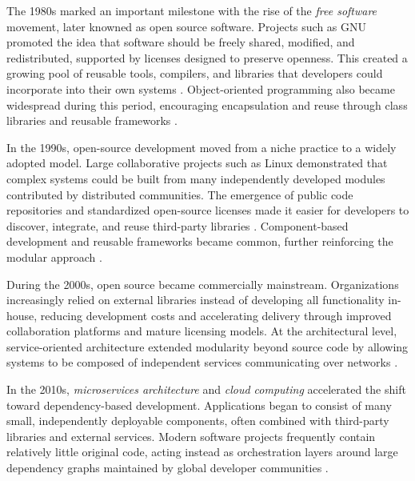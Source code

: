 \documentclass[12pt,a4paper]{report}
\begin{document}
The 1980s marked an important milestone with the rise of the \emph{free software} movement, later knowned as open source software. Projects such as GNU promoted the idea that software should be freely shared, modified, and redistributed, supported by licenses designed to preserve openness. This created a growing pool of reusable tools, compilers, and libraries that developers could incorporate into their own systems \parencite{ojhaEmergenceOrganizationalField2014}. Object-oriented programming also became widespread during this period, encouraging encapsulation and reuse through class libraries and reusable frameworks \parencite{aguilaSoftwareEngineeringTimeline2020}.

In the 1990s, open-source development moved from a niche practice to a widely adopted model. Large collaborative projects such as Linux demonstrated that complex systems could be built from many independently developed modules contributed by distributed communities. The emergence of public code repositories and standardized open-source licenses made it easier for developers to discover, integrate, and reuse third-party libraries \parencite{ojhaEmergenceOrganizationalField2014}. Component-based development and reusable frameworks became common, further reinforcing the modular approach \parencite{aguilaSoftwareEngineeringTimeline2020}.

During the 2000s, open source became commercially mainstream. Organizations increasingly relied on external libraries instead of developing all functionality in-house, reducing development costs and accelerating delivery through improved collaboration platforms and mature licensing models. At the architectural level, service-oriented architecture extended modularity beyond source code by allowing systems to be composed of independent services communicating over networks \parencite{fitzgeraldTransformationOpenSource2006,aguilaSoftwareEngineeringTimeline2020}.

In the 2010s, \emph{microservices architecture} and \emph{cloud computing} accelerated the shift toward dependency-based development. Applications began to consist of many small, independently deployable components, often combined with third-party libraries and external services. Modern software projects frequently contain relatively little original code, acting instead as orchestration layers around large dependency graphs maintained by global developer communities \parencite{newmanMonolithMicroservicesEvolutionary2019,aguilaSoftwareEngineeringTimeline2020}.
\end{document}

